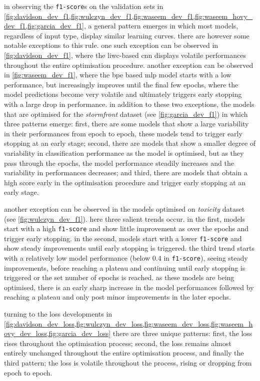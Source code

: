in observing the \texttt{f1-score}s on the validation sets in \cref{fig:davidson_dev_f1,fig:wulczyn_dev_f1,fig:waseem_dev_f1,fig:waseem_hovy_dev_f1,fig:garcia_dev_f1}, a general pattern emerges in which most models, regardless of input type, display similar learning curves.
there are however some notable exceptions to this rule.
one such exception can be observed in \cref{fig:davidson_dev_f1}, where the liwc-based cnn displays volatile performances throughout the entire optimisation procedure.
another exception can be observed in \cref{fig:waseem_dev_f1}, where the bpe based mlp model starts with a low performance, but increasingly improves until the final few epochs, where the model predictions become very volatile and ultimately triggers early stopping with a large drop in performance.
in addition to these two exceptions, the models that are optimised for the \textit{stormfront} dataset (see \cref{fig:garcia_dev_f1})  in which three patterns emerge: first, there are some models that show a large variability in their performances from epoch to epoch, these models tend to trigger early stopping at an early stage; second, there are models that show a smaller degree of variability in classification performance as the model is optimised, but as they pass through the epochs, the model performance steadily increases and the variability in performances decreases; and third, there are models that obtain a high score early in the optimisation procedure and trigger early stopping at an early stage.

another exception can be observed in the models optimised on \textit{toxicity} dataset (see \cref{fig:wulczyn_dev_f1}).
here three salient trends occur.
in the first, models start with a high \texttt{f1-score} and show little improvement as over the epochs and trigger early stopping.
in the second, models start with a lower \texttt{f1-score} and show steady improvements until early stopping is triggered.
the third trend starts with a relatively low model performance (below $0.4$ in \texttt{f1-score}), seeing steady improvements, before reaching a plateau and continuing until early stopping is triggered or the set number of epochs is reached.
as these models are being optimised, there is an early sharp increase in the model performances followed by reaching a plateau and only post minor improvements in the later epochs.

turning to the loss developments in \cref{fig:davidson_dev_loss,fig:wulczyn_dev_loss,fig:waseem_dev_loss,fig:waseem_hovy_dev_loss,fig:garcia_dev_loss} there are three unique patterns: first, the loss rises throughout the optimisation process; second, the loss remains almost entirely unchanged throughout the entire optimisation process, and finally the third pattern; the loss is volatile throughout the process, rising or dropping from epoch to epoch.

